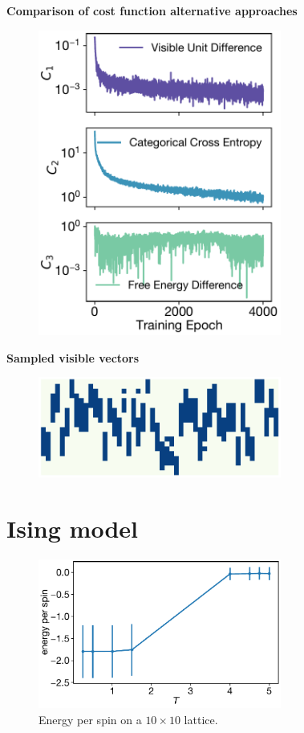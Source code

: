 \documentclass[12pt, two sided]{article}
\begin{document}
\textbf{Comparison of cost function alternative approaches}
\begin{figure}[h!]
\includegraphics[width=8cm]{Figures/cost_function_approaches.pdf}
\end{figure} 

\textbf{Sampled visible vectors}
\begin{figure}[h!]
\includegraphics[width=8cm]{Figures/sampled_visible_vectors.pdf}
\end{figure} 

\section{Ising model}

\begin{figure}[h!]
\includegraphics[width=8cm]{Figures/rbm_e.pdf}
\caption{Energy per spin on a $10\times10$ lattice.}
\end{figure} 
\end{document}
